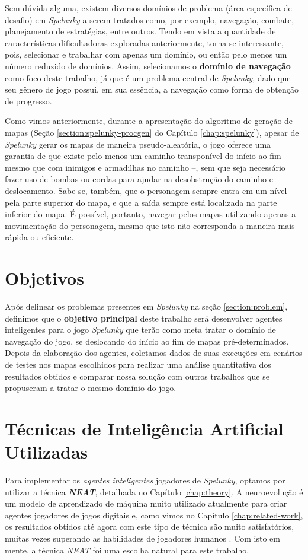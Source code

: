 Sem dúvida alguma, existem diversos domínios de problema (área específica de
desafio) em \textit{Spelunky} a serem tratados como, por exemplo, navegação,
combate, planejamento de estratégias, entre outros. Tendo em vista a quantidade
de características dificultadoras exploradas anteriormente, torna-se
interessante, pois, selecionar e trabalhar com apenas um domínio, ou então pelo
menos um número reduzido de domínios. Assim, selecionamos o \textbf{domínio de
navegação} como foco deste trabalho, já que é um problema central de
\textit{Spelunky}, dado que seu gênero de jogo possui, em sua essência, a
navegação como forma de obtenção de progresso.

Como vimos anteriormente, durante a apresentação do algoritmo de geração de
mapas (Seção \ref{section:spelunky-procgen} do Capítulo \ref{chap:spelunky}),
apesar de \textit{Spelunky} gerar os mapas de maneira pseudo-aleatória, o jogo
oferece uma garantia de que existe pelo menos um caminho transponível do início
ao fim -- mesmo que com inimigos e armadilhas no caminho --, sem que seja
necessário fazer uso de bombas ou cordas para ajudar na desobstrução do caminho
e deslocamento. Sabe-se, também, que o personagem sempre entra em um nível pela
parte superior do mapa, e que a saída sempre está localizada na parte inferior
do mapa. É possível, portanto, navegar pelos mapas utilizando apenas a
movimentação do personagem, mesmo que isto não corresponda a maneira mais rápida
ou eficiente.


\section{\label{section:objectives}Objetivos}
Após delinear os problemas presentes em \textit{Spelunky} na seção
\ref{section:problem}, definimos que o \textbf{objetivo principal} deste
trabalho será desenvolver agentes inteligentes para o jogo \textit{Spelunky} que
terão como meta tratar o domínio de navegação do jogo, se deslocando do início
ao fim de mapas pré-determinados. Depois da elaboração dos agentes, coletamos
dados de suas execuções em cenários de testes nos mapas escolhidos para
realizar uma análise quantitativa dos resultados obtidos e comparar nossa
solução com outros trabalhos que se propuseram a tratar o mesmo domínio do
jogo.


\section{\label{section:techniques}Técnicas de Inteligência Artificial
Utilizadas}
Para implementar os \textit{agentes inteligentes} jogadores de
\textit{Spelunky}, optamos por utilizar a técnica \textbf{\textit{NEAT}},
detalhada no Capítulo \ref{chap:theory}. A neuroevolução é um modelo de
aprendizado de máquina muito utilizado atualmente para criar agentes jogadores
de jogos digitais \cite{DBLP:journals/corr/RisiT14} e, como vimos no Capítulo
\ref{chap:related-work}, os resultados obtidos até agora com este tipo de
técnica são muito satisfatórios, muitas vezes superando as habilidades de
jogadores humanos \cite{NeuroEvolutionAtari}. Com isto em mente, a técnica
\textit{NEAT} foi uma escolha natural para este trabalho.

